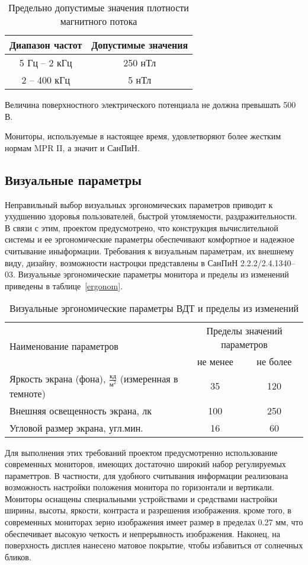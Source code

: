 \begin{table}[ht]
\caption{Предельно допустимые значения плотности магнитного потока}
\begin{tabular}{|c|c|}
\hline
Диапазон частот& Допустимые значения \\
\hline
5 Гц -- 2 кГц & 250 нТл \\
\hline
2 -- 400 кГц& 5 нТл \\
\hline
\end{tabular}
\label{tab:U}
\end{table}

Величина поверхностного электрического потенциала не должна превышать 500 В.

Мониторы, используемые в настоящее время, удовлетворяют более жестким нормам MPR II, а значит и СанПиН.

\subsection{Визуальные параметры}

Неправильный выбор визуальных эргономических параметров приводит к ухудшению здоровья пользователей, быстрой утомляемости, раздражительности. В связи с этим, проектом предусмотрено, что конструкция вычислительной системы и ее эргономические параметры обеспечивают комфортное и надежное считывание иныформации. Требования к визуальным параметрам, их внешнему виду, дизайну, возможности настроцки представлены в СанПиН 2.2.2/2.4.1340--03. Визуальные эргономические параметры монитора и пределы из изменений приведены в таблице~\ref{ergonom}.

\begin{table}[ht]
\caption{Визуальные эргономические параметры ВДТ и пределы из изменений}
\begin{tabular}{|l|c|c|}
\hline
\multirow{2}{*}{Наименование параметров} & \multicolumn{2}{c|}{Пределы значений параметров}\\
\cline{2-3}
&не менее&не более\\
\hline
Яркость экрана (фона), $\frac{\text{кд}}{\text{м}^2}$ (измеренная в темноте) &35&120\\
\hline
Внешняя освещенность экрана, лк &100&250\\
\hline
Угловой размер экрана, угл.мин. &16&60\\
\hline
\end{tabular}
\label{tab:ergonom}
\end{table}

Для выполнения этих требований проектом предусмотренно использование современных мониторов, имеющих достаточно широкий набор регулируемых параметтров.  В частности, для удобного считывания информации реализована возможность настройки положения монитора по горизонтали и вертикали. Мониторы оснащены специальными устройствами и средствами настройки ширины, высоты, яркости, контраста и разрешения изображения. кроме того, в современных мониторах зерно изображения имеет размер в пределах 0.27 мм, что обеспечивает высокую четкость и непрерывность изображения. Наконец, на поверхность дисплея нанесено матовое покрытие, чтобы избавиться от солнечных бликов.

